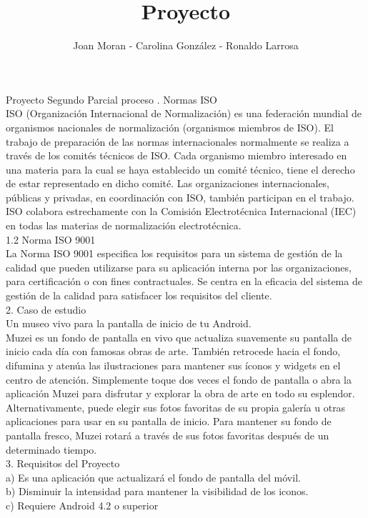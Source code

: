 \documentclass[12pt,a4paper]{article}
\author{Joan Moran - Carolina González - Ronaldo Larrosa}
\title{Proyecto}
\begin{document}
\maketitle Proyecto Segundo Parcial
proceso
.	Normas ISO\\
ISO (Organización Internacional de Normalización) es una federación mundial de organismos nacionales de normalización (organismos miembros de ISO). El trabajo de preparación de las normas internacionales normalmente se realiza a través de los comités técnicos de ISO. Cada organismo miembro interesado en una materia para la cual se haya establecido un comité técnico, tiene el derecho de estar representado en dicho comité. Las organizaciones internacionales, públicas y privadas, en coordinación con ISO, también participan en el trabajo. ISO colabora estrechamente con la Comisión Electrotécnica Internacional (IEC) en todas las materias de normalización electrotécnica.\\

1.2	Norma ISO 9001 \\

La Norma ISO 9001 especifica los requisitos para un sistema de gestión de la calidad que pueden utilizarse para su aplicación interna por las organizaciones, para certificación o con fines contractuales. Se centra en la eficacia del sistema de gestión de la calidad para satisfacer los requisitos del cliente.\\

2.	Caso de estudio\\
Un museo vivo para la pantalla de inicio de tu Android.\\
Muzei es un fondo de pantalla en vivo que actualiza suavemente su pantalla de inicio cada día con famosas obras de arte. También retrocede hacia el fondo, difumina y atenúa las ilustraciones para mantener sus íconos y widgets en el centro de atención. Simplemente toque dos veces el fondo de pantalla o abra la aplicación Muzei para disfrutar y explorar la obra de arte en todo su esplendor.\\

Alternativamente, puede elegir sus fotos favoritas de su propia galería u otras aplicaciones para usar en su pantalla de inicio. Para mantener su fondo de pantalla fresco, Muzei rotará a través de sus fotos favoritas después de un determinado tiempo.\\

3.	Requisitos del Proyecto \\
a)	Es una aplicación que actualizará el fondo de pantalla del móvil.\\
b)	Disminuir la intensidad para mantener la visibilidad de los iconos.\\
c)	Requiere Android 4.2 o superior\\
\end{document}
